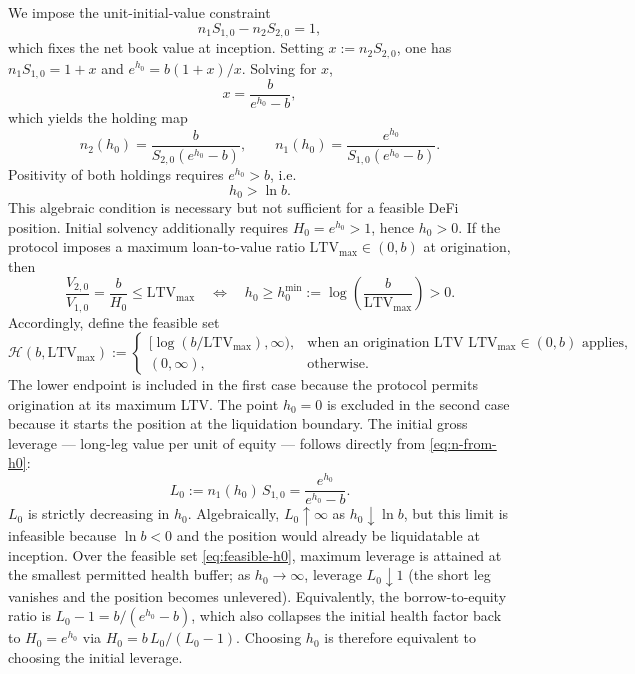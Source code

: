 \documentclass[11pt]{article}
\theoremstyle{plain}
\theoremstyle{definition}
\theoremstyle{remark}
\begin{document}
We impose the unit-initial-value constraint
\[
n_1S_{1,0}-n_2S_{2,0}=1,
\]
which fixes the net book value at inception. Setting $x:=n_2S_{2,0}$, one has $n_1S_{1,0}=1+x$ and
$e^{h_0}=b(1+x)/x$. Solving for $x$,
\[
x=\frac{b}{e^{h_0}-b},
\]
which yields the holding map
\begin{equation}\label{eq:n-from-h0}
n_2(h_0)=\frac{b}{S_{2,0}(e^{h_0}-b)},
\qquad
n_1(h_0)=\frac{e^{h_0}}{S_{1,0}(e^{h_0}-b)}.
\end{equation}
Positivity of both holdings requires $e^{h_0}>b$, i.e.
\[
h_0>\ln b.
\]
This algebraic condition is necessary but not sufficient for a feasible DeFi
position. Initial solvency additionally requires $H_0=e^{h_0}>1$, hence
$h_0>0$. If the protocol imposes a maximum loan-to-value ratio
$\mathrm{LTV}_{\max}\in(0,b)$ at origination, then
\[
\frac{V_{2,0}}{V_{1,0}}=\frac{b}{H_0}\le \mathrm{LTV}_{\max}
\quad\Longleftrightarrow\quad
h_0\ge h_0^{\min}:=\log\!\left(\frac{b}{\mathrm{LTV}_{\max}}\right)>0.
\]
Accordingly, define the feasible set
\begin{equation}\label{eq:feasible-h0}
\mathcal H(b,\mathrm{LTV}_{\max})
:=
\begin{cases}
[\log(b/\mathrm{LTV}_{\max}),\infty), & \text{when an origination LTV }\mathrm{LTV}_{\max}\in(0,b)\text{ applies},\\
(0,\infty), & \text{otherwise}.
\end{cases}
\end{equation}
The lower endpoint is included in the first case because the protocol permits
origination at its maximum LTV. The point $h_0=0$ is excluded in the second
case because it starts the position at the liquidation boundary.
The initial gross leverage — long-leg value per unit of equity — follows directly from
\eqref{eq:n-from-h0}:
\begin{equation}\label{eq:leverage}
L_0 := n_1(h_0)\,S_{1,0} = \frac{e^{h_0}}{e^{h_0}-b}.
\end{equation}
$L_0$ is strictly decreasing in $h_0$. Algebraically, $L_0\uparrow\infty$ as
$h_0\downarrow\ln b$, but this limit is infeasible because $\ln b<0$ and the
position would already be liquidatable at inception. Over the feasible set
\eqref{eq:feasible-h0}, maximum leverage is attained at the smallest permitted
health buffer;
as $h_0\to\infty$, leverage $L_0\downarrow 1$ (the short leg vanishes and the position becomes
unlevered). Equivalently, the borrow-to-equity ratio is $L_0 - 1 = b/(e^{h_0}-b)$, which also
collapses the initial health factor back to $H_0=e^{h_0}$ via $H_0 = b\,L_0/(L_0-1)$.
Choosing $h_0$ is therefore equivalent to choosing the initial leverage.
\end{document}
